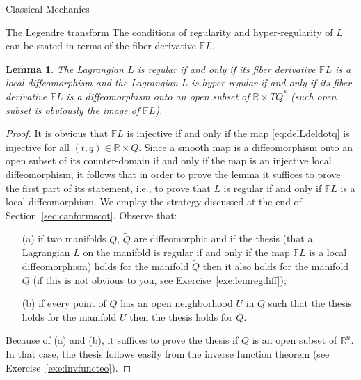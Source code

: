 \documentclass[oneside,a4paper,11pt]{amsbook}
\newcommand{\R}{\mathds R}
\theoremstyle{remark}\newtheorem{exercise}{Exercise}[chapter]
\theoremstyle{plain}\newtheorem{teo}{Theorem}[section]
\theoremstyle{plain}\newtheorem{lem}[teo]{Lemma}
\theoremstyle{plain}\newtheorem{prop}[teo]{Proposition}
\theoremstyle{plain}\newtheorem{cor}[teo]{Corollary}
\theoremstyle{definition}\newtheorem{defin}[teo]{Definition}
\theoremstyle{remark}\newtheorem{rem}[teo]{Remark}
\theoremstyle{definition}\newtheorem{notation}[teo]{Notation}
\theoremstyle{definition}\newtheorem{convention}[teo]{Convention}
\theoremstyle{definition}\newtheorem{example}[teo]{Example}
\numberwithin{section}{chapter}
\numberwithin{equation}{section}
\begin{document}
\begin{chapter}{Classical Mechanics}
\begin{section}{The Legendre transform}
The conditions of regularity and hyper-regularity of $L$ can be stated in terms of the fiber derivative $\mathbb FL$.
\begin{lem}\label{thm:LregFLdiff}
The Lagrangian $L$ is regular if and only if its fiber derivative $\mathbb FL$ is a local diffeomorphism and the Lagrangian $L$ is hyper-regular
if and only if its fiber derivative $\mathbb FL$ is a diffeomorphism onto an open subset of $\R\times TQ^*$ (such open subset is obviously
the image of $\mathbb FL$).
\end{lem}
\begin{proof}
It is obvious that $\mathbb FL$ is injective if and only if the map \eqref{eq:delLdeldotq} is injective for all $(t,q)\in\R\times Q$. Since
a smooth map is a diffeomorphism onto an open subset of its counter-domain if and only if the map is an injective local diffeomorphism, it follows that
in order to prove the lemma it suffices to prove the first part of its statement, i.e., to prove that $L$ is regular if and only if $\mathbb FL$ is a local
diffeomorphism. We employ the strategy discussed at the end of Section~\ref{sec:canformscot}. Observe that:
\begin{itemize}
\item[(a)] if two manifolds $Q$, $\widetilde Q$ are diffeomorphic and if the thesis (that a Lagrangian $L$ on the manifold is regular if and only if the map
$\mathbb FL$ is a local diffeomorphism) holds for the manifold $\widetilde Q$ then it also holds for the manifold $Q$ (if this is not obvious to you, see
Exercise~\ref{exe:lemregdiff});
\item[(b)] if every point of $Q$ has an open neighborhood $U$ in $Q$ such that the thesis holds for the manifold $U$ then the thesis holds for $Q$.
\end{itemize}
Because of (a) and (b), it suffices to prove the thesis if $Q$ is an open subset of $\R^n$. In that case, the thesis follows easily from the
inverse function theorem (see Exercise~\ref{exe:invfuncteo}).
\end{proof}


\end{section}
\end{chapter}
\end{document}
